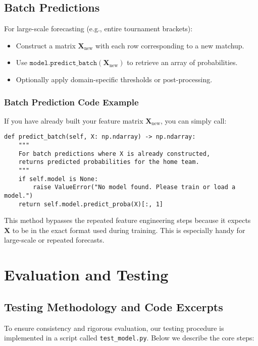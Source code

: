 \documentclass[12pt]{article}
\begin{document}
\subsection{Batch Predictions}
For large-scale forecasting (e.g., entire tournament brackets):
\begin{itemize}[noitemsep]
    \item Construct a matrix \(\mathbf{X}_{\text{new}}\) with each row corresponding to a new matchup.
    \item Use \(\texttt{model.predict\_batch}(\mathbf{X}_{\text{new}})\) to retrieve an array of probabilities.
    \item Optionally apply domain-specific thresholds or post-processing.
\end{itemize}

\subsubsection{Batch Prediction Code Example}
If you have already built your feature matrix \(\mathbf{X}_{\text{new}}\), you can simply call:

\begin{verbatim}
def predict_batch(self, X: np.ndarray) -> np.ndarray:
    """
    For batch predictions where X is already constructed,
    returns predicted probabilities for the home team.
    """
    if self.model is None:
        raise ValueError("No model found. Please train or load a model.")
    return self.model.predict_proba(X)[:, 1]
\end{verbatim}

\noindent
This method bypasses the repeated feature engineering steps because it expects \(\mathbf{X}\) to be in the exact format used during training. This is especially handy for large-scale or repeated forecasts.
\section{Evaluation and Testing}
\label{sec:evaluation_testing}
\subsection{Testing Methodology and Code Excerpts}
To ensure consistency and rigorous evaluation, our testing procedure is implemented in a script called \texttt{test\_model.py}. Below we describe the core steps:
\end{document}
